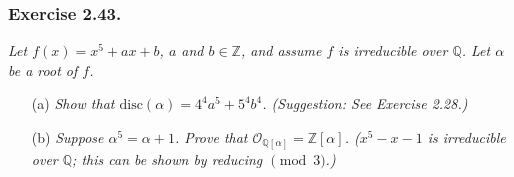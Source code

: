 \documentclass{article}
\begin{document}
\subsubsection*{Exercise 2.43.}
\emph{Let $f(x) = x^5+ax+b$, $a$ and $b \in \mathbb{Z}$,
and assume $f$ is irreducible over $\mathbb{Q}$.
Let $\alpha$ be a root of $f$.}
\begin{enumerate}
\item[(a)]
  \emph{Show that $\textrm{disc}(\alpha) = 4^4 a^5 + 5^4 b^4$. (Suggestion: See Exercise 2.28.)}

\item[(b)]
  \emph{Suppose $\alpha^5=\alpha+1$.
  Prove that $\mathcal{O}_{\mathbb{Q}[\alpha]} = \mathbb{Z}[\alpha]$.
  ($x^5 - x - 1$ is irreducible over $\mathbb{Q}$;
  this can be shown by reducing $\pmod{3}$.)} \\
\end{enumerate}
\end{document}

